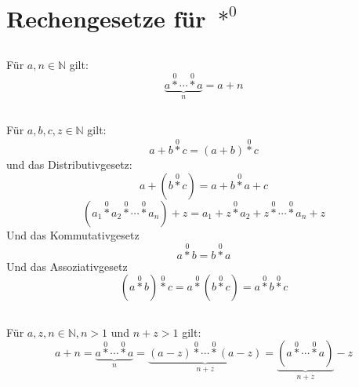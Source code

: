 \documentclass{article}
\begin{document}
\section{Rechengesetze f\"ur $\operatorname*{\ast}^0$\newline}

\subsection{}
F\"ur $a, n \in \mathbb{N}$ gilt:
\[ \underbrace{a \operatorname*{\ast}^0 \dotsb \operatorname*{\ast}^0 a}_n = a+n \]
\subsection{}
F\"ur $a, b, c, z \in \mathbb{N}$ gilt:
\[ a+b\operatorname*{\ast}^0c = \left(a+b\right)\operatorname*{\ast}^0 c \]
und das Distributivgesetz:
\[ a+\left(b\operatorname*{\ast}^0c\right) = a + b \operatorname*{\ast}^0 a + c \]
\[ \left( a_1 \operatorname*{\ast}^0 a_2 \operatorname*{\ast}^0 \dotsb \operatorname*{\ast}^0 a_n \right) + z =
         a_1 + z \operatorname*{\ast}^0 a_2 + z \operatorname*{\ast}^0 \dotsb \operatorname*{\ast}^0 a_n +z \]
Und das Kommutativgesetz
\[ a \operatorname*{\ast}^0 b = b \operatorname*{\ast}^0 a \]
Und das Assoziativgesetz
\[ \left( a \operatorname*{\ast}^0 b \right) \operatorname*{\ast}^0 c = a \operatorname*{\ast}^0 \left( b \operatorname*{\ast}^0 c \right) =
   a \operatorname*{\ast}^0 b \operatorname*{\ast}^0 c \]
\subsection{}
F\"ur $a, z, n \in \mathbb{N}, n > 1$ und $n+z > 1$ gilt:
\[ a + n = \underbrace{a \operatorname*{\ast}^0 \dotsb \operatorname*{\ast}^0 a}_n =
   \underbrace{\left(a - z\right) \operatorname*{\ast}^0 \dotsb \operatorname*{\ast}^0 \left(a - z\right)}_{n+z} =
   \underbrace{\left(a \operatorname*{\ast}^0 \dotsb \operatorname*{\ast}^0 a\right)}_{n+z} - z \]
\end{document}
